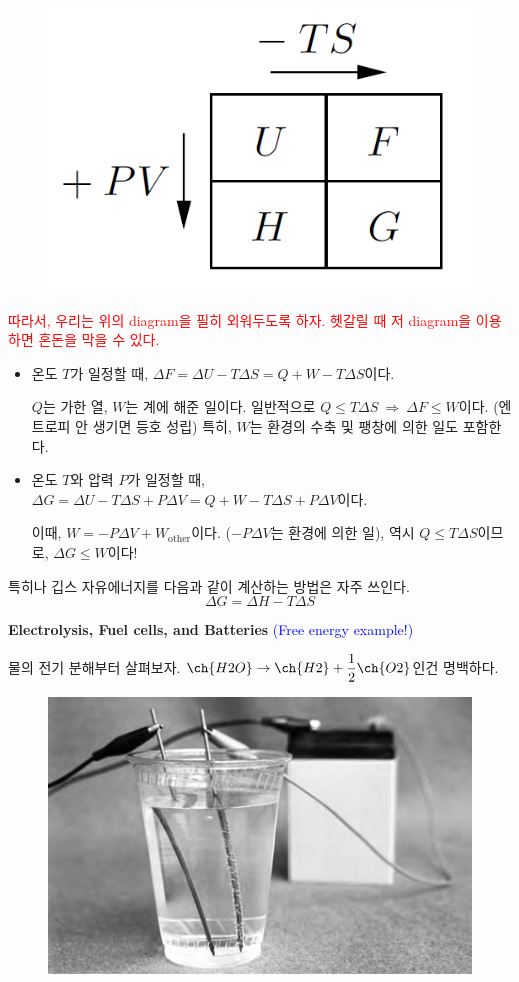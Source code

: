 \documentclass{article}
\begin{document}
\begin{figure}[h]
\centering
\includegraphics[width=0.4\linewidth]{images/fig1_2.png}
\end{figure}

\noindent
\textcolor{red}{따라서, 우리는 위의 diagram을 필히 외워두도록 하자. 헷갈릴 때 저 diagram을 이용하면 혼돈을 막을 수 있다.}

\begin{itemize}
    \item 온도 $T$가 일정할 때, $\Delta F = \Delta U - T\Delta S = Q + W - T\Delta S$이다. 
    
    $Q$는 가한 열, $W$는 계에 해준 일이다. 일반적으로 $Q \leq T\Delta S \ \Rightarrow \ \Delta F \leq W$이다. (엔트로피 안 생기면 등호 성립) 특히, $W$는 환경의 수축 및 팽창에 의한 일도 포함한다.

    \item 온도 $T$와 압력 $P$가 일정할 때, $\Delta G = \Delta U - T \Delta S + P \Delta V = Q + W - T \Delta S + P \Delta V$이다.
    
    이때, $W = -P\Delta V + W_{\text{other}}$이다. ($-P\Delta V$는 환경에 의한 일), 역시 $Q \leq T\Delta S$이므로, $\Delta G \leq W$이다!
\end{itemize}

특히나 깁스 자유에너지를 다음과 같이 계산하는 방법은 자주 쓰인다.
\begin{equation}
    \Delta G = \Delta H - T \Delta S
\end{equation}

\newpage

\noindent
\textbf{Electrolysis, Fuel cells, and Batteries} \textcolor{blue}{(Free energy example!)}

\vspace{1mm}
물의 전기 분해부터 살펴보자. $\ch{H2 O} \rightarrow  \ch{H2} + \dfrac{1}{2} \ch{O2}$인건 명백하다.

\begin{figure}[h]
\centering
\includegraphics[width=0.35\linewidth]{images/fig1_3.jpeg}
\end{figure}
\end{document}
